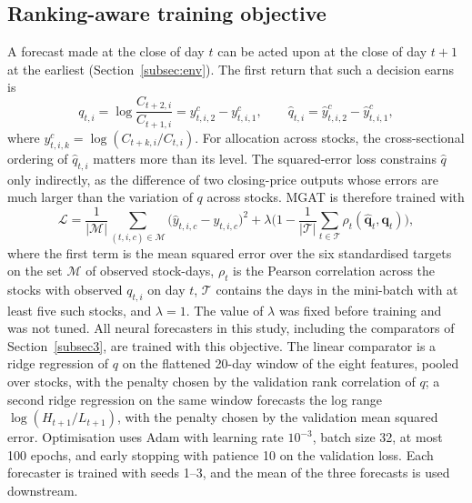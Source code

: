 \documentclass[pdflatex,sn-mathphys-num]{sn-jnl}%
\theoremstyle{thmstyleone}%
\theoremstyle{thmstyletwo}%
\theoremstyle{thmstylethree}%
\begin{document}
\subsection{Ranking-aware training objective}\label{subsec:objective}
{\color{blue}A forecast made at the close of day $t$ can be acted upon at the close of day $t+1$ at the earliest (Section~\ref{subsec:env}). The first return that such a decision earns is
\begin{equation}
q_{t,i}=\log\frac{C_{t+2,i}}{C_{t+1,i}}=y^{c}_{t,i,2}-y^{c}_{t,i,1},\qquad \hat q_{t,i}=\hat y^{c}_{t,i,2}-\hat y^{c}_{t,i,1},
\label{eq:q}
\end{equation}
where $y^{c}_{t,i,k}=\log(C_{t+k,i}/C_{t,i})$. For allocation across stocks, the cross-sectional ordering of $\hat q_{t,i}$ matters more than its level. The squared-error loss constrains $\hat q$ only indirectly, as the difference of two closing-price outputs whose errors are much larger than the variation of $q$ across stocks. MGAT is therefore trained with
\begin{equation}
\mathcal{L}=\frac{1}{|\mathcal{M}|}\sum_{(t,i,c)\in\mathcal{M}}\big(\hat y_{t,i,c}-y_{t,i,c}\big)^2+\lambda\Big(1-\frac{1}{|\mathcal{T}|}\sum_{t\in\mathcal{T}}\rho_t(\hat{\mathbf{q}}_t,\mathbf{q}_t)\Big),
\label{eq:loss}
\end{equation}
where the first term is the mean squared error over the six standardised targets on the set $\mathcal{M}$ of observed stock-days, $\rho_t$ is the Pearson correlation across the stocks with observed $q_{t,i}$ on day $t$, $\mathcal{T}$ contains the days in the mini-batch with at least five such stocks, and $\lambda=1$. The value of $\lambda$ was fixed before training and was not tuned. All neural forecasters in this study, including the comparators of Section~\ref{subsec3}, are trained with this objective. The linear comparator is a ridge regression of $q$ on the flattened 20-day window of the eight features, pooled over stocks, with the penalty chosen by the validation rank correlation of $q$; a second ridge regression on the same window forecasts the log range $\log(H_{t+1}/L_{t+1})$, with the penalty chosen by the validation mean squared error. Optimisation uses Adam with learning rate $10^{-3}$, batch size 32, at most 100 epochs, and early stopping with patience 10 on the validation loss. Each forecaster is trained with seeds 1--3, and the mean of the three forecasts is used downstream.\par}
\end{document}
